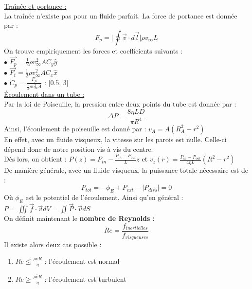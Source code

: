\documentclass[../main.tex]{subfiles}
\begin{document}
\quad \underline{Traînée et portance :}\\
La traînée n'existe pas pour un fluide parfait. La force de portance est donnée par :\\
\begin{equation}
    F_p = \lvert \oint \vec{v}\cdot d\vec{l} \rvert \rho v_{\infty} L
\end{equation}
On trouve empiriquement les forces et coefficients suivants :\\
$\bullet$ $\vec{F_p} = \frac{1}{2} \rho v_{\infty}^2 A C_y \hat{y}$\\
$\bullet$ $\vec{F_t} = \frac{1}{2} \rho v_{\infty}^2 A C_x \hat{x}$\\
$\bullet$ $C_p = \frac{F_p}{\frac{1}{2} \rho v_{\infty}^2 A}$ : [0.5, 3]\\

\quad \underline{Écoulement dans un tube :}\\
Par la loi de Poiseuille, la pression entre deux points du tube est donnée par :\\
\begin{equation}
    \Delta P = \frac{8\eta LD}{\pi R^4}
\end{equation}
Ainsi, l'écoulement de poiseuille est donné par : $v_A = A(R_A^2-r^2)$\\
En effet, avec un fluide visqueux, la vitesse sur les parois est nulle. Celle-ci dépend donc de notre position vis à vis du centre.\\

Dès lors, on obtient : $P(z) = P_{in} - \frac{P_{_in}-P_{out}}{L}z$ et $v_z(r) = \frac{P_{in}-P_{out}}{4\eta L} (R^2-r^2)$\\

De manière générale, avec un fluide visqueux, la puissance totale nécessaire est de :\\
\begin{equation}
    P_{tot} = -\phi_E + P_{ext} - \lvert P_{diss} \rvert = 0
\end{equation}
Où $\phi_E$ est le potentiel de l'écoulement. Ainsi qu'en général : $P = \iiint \vec{f}\cdot \vec{v}dV = \iint \vec{P}\cdot \vec{v}dS$\\

On définit maintenant le \textbf{nombre de Reynolds :}\\
\begin{equation}
    Re = \frac{f_{inertielles}}{f_{visqueuses}}
\end{equation}
Il existe alors deux cas possible :\\
\begin{enumerate}
    \item $Re \leq \frac{\rho \overline{v}R}{\eta}$ : l'écoulement est normal\\
    \item $Re \geq \frac{\rho \overline{v}R}{\eta}$ : l'écoulement est turbulent\\
\end{enumerate}
\end{document}
